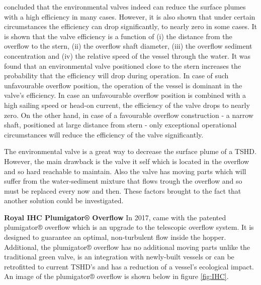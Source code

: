 \noindent \cite{Decrop} concluded that the environmental valves indeed can reduce the surface plumes with a high efficiency in many cases. However, it is also shown that under certain circumstances the efficiency can drop significantly, to nearly zero in some cases. It is shown that the valve efficiency is a function of (i) the distance from the overflow to the stern, (ii) the overflow shaft diameter, (iii) the overflow sediment concentration and (iv) the relative speed of the vessel through
the water. \newline
It was found that an environmental valve positioned close to the stern increases the probability that the efficiency will drop during operation. In case of such unfavourable overflow position, the operation of the vessel is dominant in the valve's efficiency. In case an unfavourable overflow position is combined with a high sailing speed or head-on current, the efficiency of the valve drops to nearly zero. \newline
On the other hand, in case of a favourable overflow construction - a narrow shaft, positioned at large distance from stern - only exceptional operational circumstances will reduce the efficiency of the valve significantly. \newline 

\noindent The environmental valve is a great way to decrease the surface plume of a TSHD. However, the main drawback is the valve it self which is located in the overflow and so hard reachable to maintain. Also the valve has moving parts which will suffer from the water-sediment mixture that flows trough the overflow and so must be replaced every now and then. These factors brought to the fact that another solution could be investigated.



\newpage

\noindent \textbf{Royal IHC Plumigator® Overflow} \newline
In 2017, \cite{IHC} came with the patented plumigator® overflow which is an upgrade to the telescopic overflow system. It is designed to guarantee an optimal, non-turbulent flow inside the hopper. Additional, the plumigator® overflow has no additional moving parts unlike the traditional green valve, is an integration with newly-built vessels or can be retrofitted to current TSHD's and has a reduction of a vessel's ecological impact. An image of the plumigator® overflow is shown below in figure \ref{fig:IHC}.


